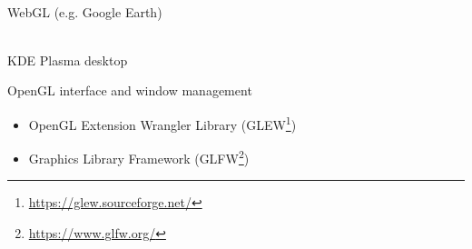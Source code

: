 \documentclass[calcdimensions,landscape,letterpaper]{powersem}
\newcommand{\thecurrentheading}{}
\newcommand{\heading}[1]{\renewcommand{\thecurrentheading}{#1}}
\begin{document}
\begin{slide}
\begin{center}
\begin{minipage}[c]{.47\textwidth}
\begin{center}
        \\
        WebGL (e.g. Google Earth)
      \end{center}
    \end{minipage}
    \begin{minipage}[c]{.47\textwidth}
      \begin{center}
        \\
        KDE Plasma desktop
      \end{center}
    \end{minipage}
  \end{center}
\end{slide}

\begin{slide}
    \heading{Getting Started: GLEW and GLFW}
    \begin{center}
        \begin{minipage}[c]{.8\textwidth}
            OpenGL interface and window management
            \begin{itemize}
                \item OpenGL Extension Wrangler Library (GLEW\footnote{\url{https://glew.sourceforge.net/}})
                \item Graphics Library Framework (GLFW\footnote{\url{https://www.glfw.org/}})
            \end{itemize}
        \end{minipage}
    \end{center}
\end{slide}
\end{document}
